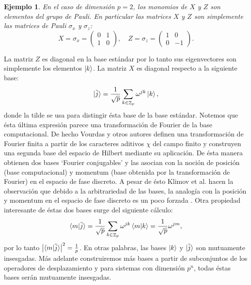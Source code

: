 \documentclass[a4paper]{report}
\DeclareMathOperator{\Z}{\mathbb{Z}}
\newtheorem{example}{Ejemplo}
\begin{document}
  \begin{example}
    En el caso de dimensión $p = 2$, los monomios de $X$ y
    $Z$ son elementos del \textit{grupo de Pauli}. En
    particular las matrices $X$ y $Z$ son simplemente las
    matrices de Pauli $\sigma_x$ y $\sigma_z$:
    \[
      X = \sigma_x =
      \begin{pmatrix} 0 & 1 \\ 1 & 0 \end{pmatrix},
      \quad
      Z = \sigma_z =
      \begin{pmatrix} 1 & 0 \\ 0 & -1 \end{pmatrix}. 
    \] 
  \end{example}
  La matriz $Z$ es diagonal en la base estándar por lo tanto
  sus eigenvectores son simplemente los elementos $\ket k$.
  La matriz $X$ es diagonal respecto a la siguiente base:
  \[
    \ket{\tilde j}
    = \frac{1}{\sqrt{p}} \sum_{k \in \Z_p}^{}
    \omega^{j k} \ket k,
  \] 
  donde la tilde se usa para distingir ésta base de la base
  estándar. Notemos que ésta última expresión parece una
  transformación de Fourier de la base computacional. De
  hecho Vourdas y otros autores definen una transformación
  de Fourier finita a partir de los caracteres aditivos
  $\chi$ del campo finito y construyen una segunda base del
  espacio de Hilbert mediante su aplicación. De ésta manera
  obtienen dos bases `Fourier conjugables' y las asocian con
  la noción de posición (base computacional) y momentum
  (base obtenida por la transformación de Fourier) en el
  espacio de fase discreto. A pesar de ésto Klimov et al.
  hacen la observación que debido a la arbitrariedad de las
  bases, la analogía con la posición y momentum en el
  espacio de fase discreto es un poco forzada
  \cite{bjork2008}. Otra propiedad interesante de éstas dos
  bases surge del siguiente cálculo:
  \begin{equation}
    \braket{m|\tilde j}
    = \frac{1}{\sqrt{p}}
    \sum_{k \in \Z_p}^{} \omega^{jk} \braket{m|k}
    = \frac{1}{\sqrt{p}} \omega^{jm},
  \end{equation}
  por lo tanto $\left|\braket{m|\tilde j}\right|^2 =
  \frac{1}{p}$. En otras palabras, las bases $\ket k$ y
  $\ket{\tilde j}$ son mutuamente insesgadas. Más adelante
  construiremos más bases a partir de subconjuntos de los
  operadores de desplazamiento y para sistemas con dimensión
  $p^{n}$, todas éstas bases serán mutuamente insesgadas.
\end{document}
